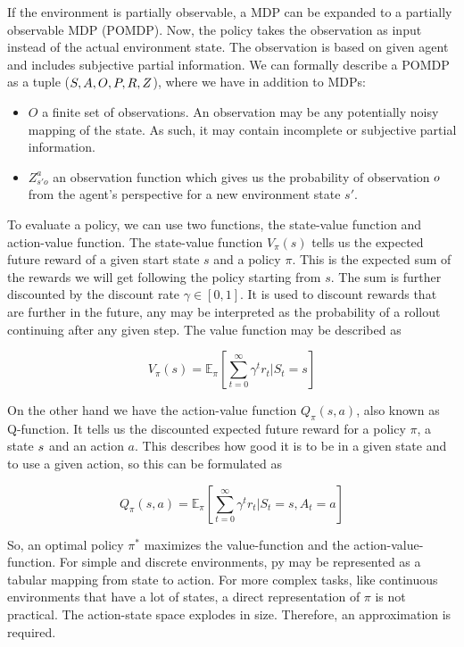 If the environment is partially observable, a MDP can be expanded to a partially observable MDP (POMDP). Now, the policy takes the observation as input instead of the actual environment state. The observation is based on given agent and includes subjective partial information. We can formally describe a POMDP as a tuple ($S, A, O, P, R, Z$), where we have in addition to MDPs:
\begin{itemize}[noitemsep,nolistsep]
	\item $O$ a finite set of observations. An observation may be any potentially noisy mapping of the state. As such, it may contain incomplete or subjective partial information.
	\item $Z_{s'o}^a$ an observation function which gives us the probability of observation $o$ from the agent's perspective for a new environment state $s'$.
\end{itemize}

To evaluate a policy, we can use two functions, the state-value function and action-value function. The state-value function $V_\pi(s)$ tells us the expected future reward of a given start state $s$ and a policy $\pi$. This is the expected sum of the rewards we will get following the policy starting from $s$. The sum is further discounted by the discount rate $\gamma \in [0,1]$. It is used to discount rewards that are further in the future, any may be interpreted as the probability of a rollout continuing after any given step. The value function may be described as

\begin{equation}
    V_\pi(s) = \mathbb{E}_\pi \left [ \sum_{t=0}^\infty \gamma^t r_t | S_t = s\right ] \nonumber
\end{equation} \par

On the other hand we have the action-value function $Q_\pi(s,a)$, also known as Q-function. It tells us the discounted expected future reward for a policy $\pi$, a state $s$ and an action $a$. This describes how good it is to be in a given state and to use a given action, so this can be formulated as

\begin{equation}
    Q_\pi(s,a) = \mathbb{E}_\pi [\sum_{t=0}^\infty \gamma^t r_t | S_t = s, A_t = a] \nonumber
\end{equation} \par

So, an optimal policy $\pi^*$ maximizes the value-function and the action-value-function. For simple and discrete environments, py may be represented as a tabular mapping from state to action. For more complex tasks, like continuous environments that have a lot of states, a direct representation of $\pi$ is not practical. The action-state space explodes in size. Therefore, an approximation is required. \par

